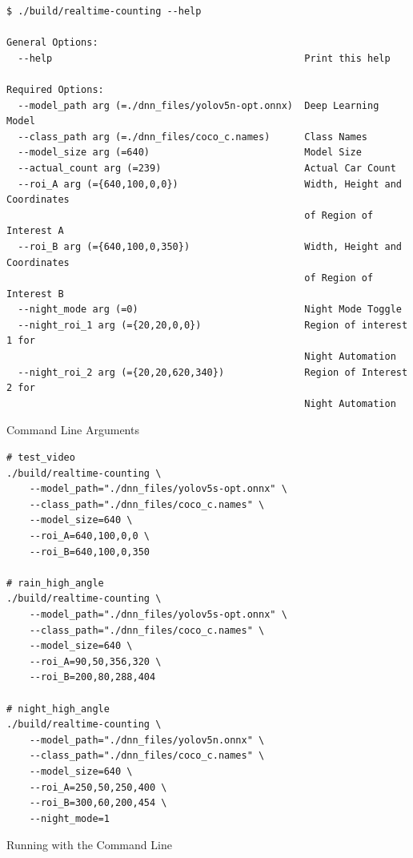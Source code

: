 \documentclass[12pt,a4paper,fleqn]{report}
\begin{document}
\begin{listing}[htbp]
\begin{verbatim}
$ ./build/realtime-counting --help

General Options:
  --help                                            Print this help

Required Options:
  --model_path arg (=./dnn_files/yolov5n-opt.onnx)  Deep Learning Model
  --class_path arg (=./dnn_files/coco_c.names)      Class Names
  --model_size arg (=640)                           Model Size
  --actual_count arg (=239)                         Actual Car Count
  --roi_A arg (={640,100,0,0})                      Width, Height and Coordinates
                                                    of Region of Interest A
  --roi_B arg (={640,100,0,350})                    Width, Height and Coordinates
                                                    of Region of Interest B
  --night_mode arg (=0)                             Night Mode Toggle
  --night_roi_1 arg (={20,20,0,0})                  Region of interest 1 for 
                                                    Night Automation
  --night_roi_2 arg (={20,20,620,340})              Region of Interest 2 for 
                                                    Night Automation
\end{verbatim}
\caption{Command Line Arguments}
\label{lst:cla}
\end{listing}

\begin{listing}[htbp]
\begin{verbatim}
# test_video
./build/realtime-counting \
    --model_path="./dnn_files/yolov5s-opt.onnx" \
    --class_path="./dnn_files/coco_c.names" \
    --model_size=640 \
    --roi_A=640,100,0,0 \
    --roi_B=640,100,0,350

# rain_high_angle
./build/realtime-counting \
    --model_path="./dnn_files/yolov5s-opt.onnx" \
    --class_path="./dnn_files/coco_c.names" \
    --model_size=640 \
    --roi_A=90,50,356,320 \
    --roi_B=200,80,288,404

# night_high_angle
./build/realtime-counting \
    --model_path="./dnn_files/yolov5n.onnx" \
    --class_path="./dnn_files/coco_c.names" \
    --model_size=640 \
    --roi_A=250,50,250,400 \
    --roi_B=300,60,200,454 \
    --night_mode=1
\end{verbatim}
\caption{Running with the Command Line}
\label{lst:clrun}
\end{listing}
\end{document}
